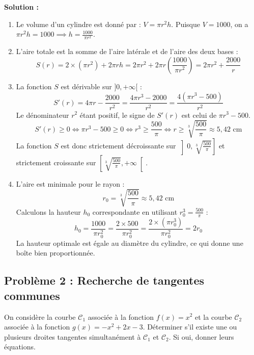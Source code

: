 \textbf{Solution :}
\begin{enumerate}
    \item Le volume d'un cylindre est donné par : $V = \pi r^2 h$.
    Puisque $V = 1000$, on a $\pi r^2 h = 1000 \implies h = \frac{1000}{\pi r^2}$.
    
    \item L'aire totale est la somme de l'aire latérale et de l'aire des deux bases :
    \[
    S(r) = 2 \times (\pi r^2) + 2\pi r h = 2\pi r^2 + 2\pi r \left( \frac{1000}{\pi r^2} \right) = 2\pi r^2 + \frac{2000}{r}
    \]
    
    \item La fonction $S$ est dérivable sur $]0, +\infty[$ :
    \[
    S'(r) = 4\pi r - \frac{2000}{r^2} = \frac{4\pi r^3 - 2000}{r^2} = \frac{4(\pi r^3 - 500)}{r^2}
    \]
    Le dénominateur $r^2$ étant positif, le signe de $S'(r)$ est celui de $\pi r^3 - 500$.
    \[
    S'(r) \ge 0 \iff \pi r^3 - 500 \ge 0 \iff r^3 \ge \frac{500}{\pi} \iff r \ge \sqrt[3]{\frac{500}{\pi}} \approx 5,42 \text{ cm}
    \]
    La fonction $S$ est donc strictement décroissante sur $\left]0, \sqrt[3]{\frac{500}{\pi}}\right]$ et strictement croissante sur $\left[\sqrt[3]{\frac{500}{\pi}}, +\infty\right[$.
    
    \item L'aire est minimale pour le rayon :
    \[
    r_0 = \sqrt[3]{\frac{500}{\pi}} \approx 5,42 \text{ cm}
    \]
    Calculons la hauteur $h_0$ correspondante en utilisant $r_0^3 = \frac{500}{\pi}$ :
    \[
    h_0 = \frac{1000}{\pi r_0^2} = \frac{2 \times 500}{\pi r_0^2} = \frac{2 \times (\pi r_0^3)}{\pi r_0^2} = 2r_0
    \]
    La hauteur optimale est égale au diamètre du cylindre, ce qui donne une boîte bien proportionnée.
\end{enumerate}

\subsection*{Problème 2 : Recherche de tangentes communes}
On considère la courbe $\mathcal{C}_1$ associée à la fonction $f(x) = x^2$ et la courbe $\mathcal{C}_2$ associée à la fonction $g(x) = -x^2 + 2x - 3$.
Déterminer s'il existe une ou plusieurs droites tangentes simultanément à $\mathcal{C}_1$ et $\mathcal{C}_2$. Si oui, donner leurs équations.

